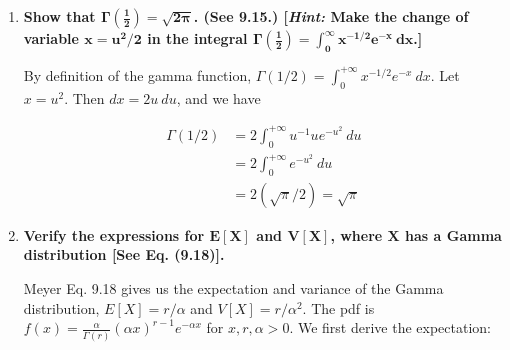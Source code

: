 \documentclass[10pt, oneside]{article}
\begin{document}
\begin{enumerate}[label=9.\arabic*]
A few steps of calculations reduces the above to

\[ E[R] = -(C_3 + C_4) H + (C_2 - C_1 + C_4) \frac{1}{\beta} - (C_2 - C_1 + C_4) \frac{1}{\beta} e^{-\beta H} \]

To find the value of $H$ that maximizes $E[R]$, we differentiate with respect to $H$:

\begin{align*}
\frac{d E[R]}{dH} &= - (C_3 + C_4) + (C_2 - C_1 + C_4) e^{-\beta H} = 0 \\
\implies e^{-\beta H} &= \frac{C_3 + C_4}{C_2 - C_1 + C_4} \\
\implies H &= \boxed{ -\frac{1}{\beta} \ln \bigg( \frac{C_3 + C_4}{C_2 - C_1 + C_4} \bigg) }
\end{align*}

where we impose the condition that $0 < \frac{C_3 + C_4}{C_2 - C_1 + C_4} < 1$.

\item  \begin{tcolorbox}[
  colback=Cerulean!5!white,
  colframe=Cerulean!75!black]
\textbf{Show that $\bm{\Gamma (\frac{1}{2}) = \sqrt{2 \pi}}$. (See 9.15.) [\textit{Hint:} Make the change of variable $\bm{x = u^2 / 2}$ in the integral $\bm{\Gamma(\frac{1}{2}) = \int^\infty_0 x^{-1/2} e^{-x} \ dx}$.]}
\end{tcolorbox}

By definition of the gamma function, $\Gamma (1/2) = \int^{+\infty}_0 x^{-1/2} e^{-x} \ dx$. Let $x = u^2$. Then $dx = 2u \ du$, and we have

\begin{align*}
\Gamma(1/2) &= 2 \int^{+\infty}_0 u^{-1} u e^{-u^2} \ du \\
&= 2 \int^{+\infty}_0 e^{-u^2} \ du \\
&= 2 (\sqrt{\pi} / 2) = \boxed{\sqrt{\pi}}
\end{align*}

\newpage
\item  \begin{tcolorbox}[
  colback=Cerulean!5!white,
  colframe=Cerulean!75!black]
\textbf{Verify the expressions for $\bm{E[X]}$ and $\bm{V[X]}$, where $\bm{X}$ has a Gamma distribution [See Eq. (9.18)].}
\end{tcolorbox}

Meyer Eq. 9.18 gives us the expectation and variance of the Gamma distribution, $E[X] = r/\alpha$ and $V[X] = r/\alpha^2$. The pdf is $f(x) = \frac{\alpha}{\Gamma(r)} (\alpha x)^{r-1} e^{-\alpha x}$ for $x, r, \alpha > 0$. We first derive the expectation:


\end{enumerate}
\end{document}
